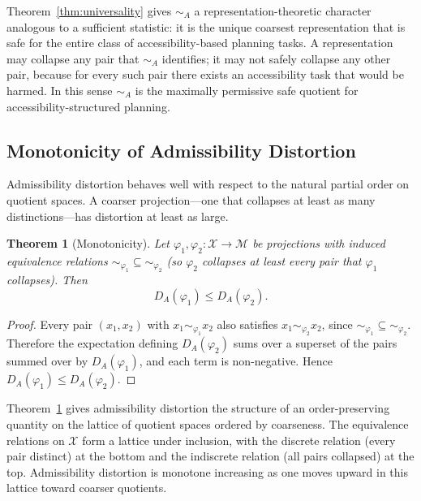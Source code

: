 \documentclass[11pt, a4paper]{article}
\theoremstyle{plain}
\newtheorem{theorem}{Theorem}
\theoremstyle{definition}
\theoremstyle{remark}
\newcommand{\simA}{\sim_A}
\begin{document}
Theorem~\ref{thm:universality} gives $\simA$ a representation-theoretic
character analogous to a sufficient statistic: it is the unique coarsest
representation that is safe for the entire class of accessibility-based
planning tasks. A representation may collapse any pair that $\simA$ identifies;
it may not safely collapse any other pair, because for every such pair there
exists an accessibility task that would be harmed. In this sense $\simA$ is the
maximally permissive safe quotient for accessibility-structured planning.

\subsection{Monotonicity of Admissibility Distortion}

Admissibility distortion behaves well with respect to the natural partial order
on quotient spaces. A coarser projection---one that collapses at least as many
distinctions---has distortion at least as large.

\begin{theorem}[Monotonicity]
\label{thm:monotone}
Let $\varphi_1, \varphi_2 : \mathcal{X} \to \mathcal{M}$ be projections with
induced equivalence relations ${\sim_{\varphi_1}} \subseteq {\sim_{\varphi_2}}$
(so $\varphi_2$ collapses at least every pair that $\varphi_1$ collapses).
Then
\begin{equation}
  D_A(\varphi_1) \leq D_A(\varphi_2).
\end{equation}
\end{theorem}

\begin{proof}
Every pair $(x_1, x_2)$ with $x_1 \sim_{\varphi_1} x_2$ also satisfies
$x_1 \sim_{\varphi_2} x_2$, since ${\sim_{\varphi_1}} \subseteq
{\sim_{\varphi_2}}$. Therefore the expectation defining $D_A(\varphi_2)$ sums
over a superset of the pairs summed over by $D_A(\varphi_1)$, and each term
is non-negative. Hence $D_A(\varphi_1) \leq D_A(\varphi_2)$.
\end{proof}

Theorem~\ref{thm:monotone} gives admissibility distortion the structure of an
order-preserving quantity on the lattice of quotient spaces ordered by coarseness.
The equivalence relations on $\mathcal{X}$ form a lattice under inclusion, with
the discrete relation (every pair distinct) at the bottom and the indiscrete
relation (all pairs collapsed) at the top. Admissibility distortion is monotone
increasing as one moves upward in this lattice toward coarser quotients.
\end{document}
